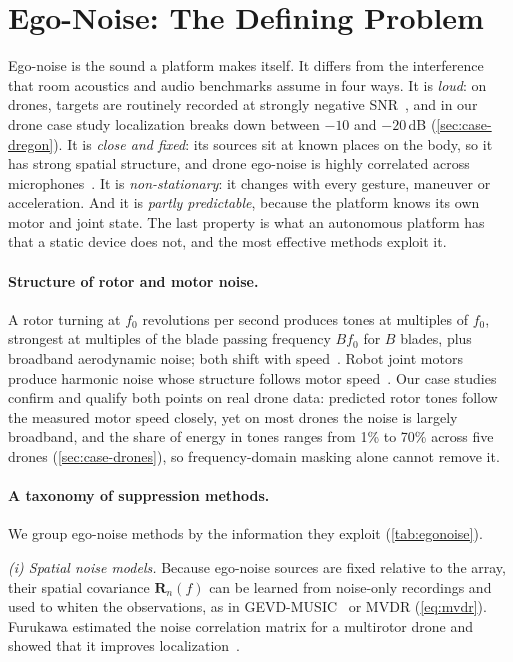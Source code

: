 \section{Ego-Noise: The Defining Problem}
\label{sec:egonoise}

Ego-noise is the sound a platform makes itself.
It differs from the interference that room acoustics and audio benchmarks assume in four ways.
It is \emph{loud}: on drones, targets are routinely recorded at strongly negative SNR~\cite{strauss2018dregon,deleforge2019spcup,ruizespitia2018aira}, and in our drone case study localization breaks down between $-10$ and $-20$\,dB (\cref{sec:case-dregon}).
It is \emph{close and fixed}: its sources sit at known places on the body, so it has strong spatial structure, and drone ego-noise is highly correlated across microphones~\cite{ruizespitia2018aira}.
It is \emph{non-stationary}: it changes with every gesture, maneuver or acceleration.
And it is \emph{partly predictable}, because the platform knows its own motor and joint state.
The last property is what an autonomous platform has that a static device does not, and the most effective methods exploit it.

\paragraph{Structure of rotor and motor noise.}
A rotor turning at $f_0$ revolutions per second produces tones at multiples of $f_0$, strongest at multiples of the blade passing frequency $B f_0$ for $B$ blades, plus broadband aerodynamic noise; both shift with speed~\cite{yen2023ncm}.
Robot joint motors produce harmonic noise whose structure follows motor speed~\cite{schmidt2018egonoise}.
Our case studies confirm and qualify both points on real drone data: predicted rotor tones follow the measured motor speed closely, yet on most drones the noise is largely broadband, and the share of energy in tones ranges from 1\% to 70\% across five drones (\cref{sec:case-drones}), so frequency-domain masking alone cannot remove it.

\paragraph{A taxonomy of suppression methods.}
We group ego-noise methods by the information they exploit (\cref{tab:egonoise}).

\emph{(i) Spatial noise models.}
Because ego-noise sources are fixed relative to the array, their spatial covariance $\mathbf{R}_n(f)$ can be learned from noise-only recordings and used to whiten the observations, as in GEVD-MUSIC~\cite{nakamura2011gevd,okutani2012quadrocopter} or MVDR (\cref{eq:mvdr}).
Furukawa \etal estimated the noise correlation matrix for a multirotor drone and showed that it improves localization~\cite{furukawa2013ncm}.

